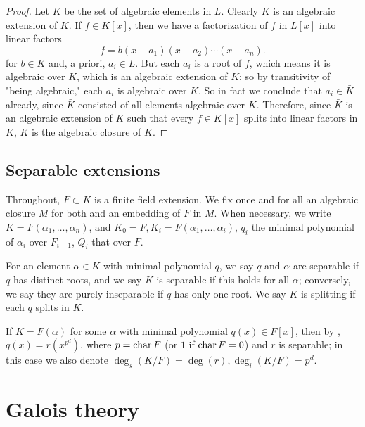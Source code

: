 \begin{proof}
Let $ \bar{K}$ be the set of algebraic elements in $ L$. Clearly $ \bar{K}$ is an algebraic extension of $ K$. If $ f \in \bar{K}[x]$, then we have a factorization of $ f$ in $ L[x]$ into linear factors
\[ f = b(x - a_1)(x - a_2) \dotsb (x - a_n). \]
for $ b \in \bar{K}$ and, a priori, $ a_i \in L$. But each $ a_i$ is a root of $ f$, which means it is algebraic over $ \bar{K}$, which is an algebraic extension of $ K$; so by transitivity of "being algebraic," each $ a_i$ is algebraic over $ K$. So in fact we conclude that $ a_i \in \bar{K}$ already, since $ \bar{K}$ consisted of all elements algebraic over $ K$. Therefore, since $ \bar{K}$ is an algebraic extension of $ K$ such that every $ f \in \bar{K}[x]$ splits into linear factors in $ \bar{K}$, $ \bar{K}$ is the algebraic closure of $ K$.

\end{proof}


\subsection{Separable extensions}
Throughout, $F \subset K$ is a finite field extension.  We fix once and for
all an algebraic closure $M$ for both and an embedding of $F$ in $M$.  When
necessary, we write $K = F(\alpha_1, \dots, \alpha_n)$, and $K_0 = F, K_i =
F(\alpha_1, \dots, \alpha_i)$, $q_i$ the minimal polynomial of $\alpha_i$ over
$F_{i - 1}$, $Q_i$ that over $F$.

\begin{definition}

For an element $\alpha \in K$ with minimal polynomial $q$, we say
$q$ and $\alpha$ are separable if $q$ has distinct roots, and we say $K$ is
separable if this holds for all $\alpha$; conversely, we say they are purely
inseparable if $q$ has only one root.  We say $K$ is splitting if each $q$
splits in $K$.
\label{def:sepsplit}
\end{definition}


\begin{definition} If $K = F(\alpha)$ for some $\alpha$ with minimal polynomial
$q(x) \in F[x]$, then by , $q(x) = r(x^{p^d})$, where $p =
\operatorname{\text{char}}{F}$ (or $1$ if $\operatorname{\text{char}}{F} = 0$) and $r$ is separable; in this case we
also denote $\deg_s(K/F) = \deg(r), \deg_i(K/F) = p^d$.  \label{def:prim_sep}
\end{definition}


\section{Galois theory}
